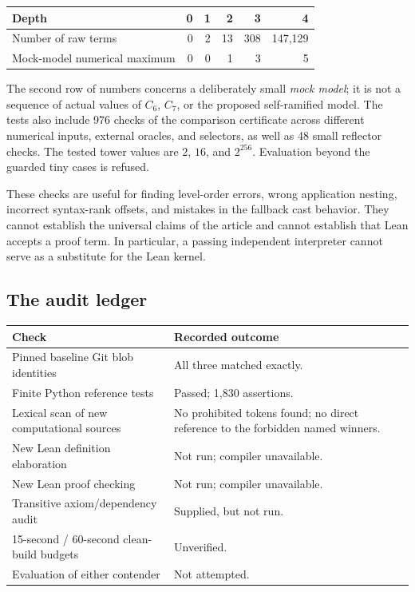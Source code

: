 \documentclass[11pt,letterpaper]{article}
\theoremstyle{definition}
\begin{document}
\begin{center}
\begin{tabular}{@{}lrrrrr@{}}
\toprule
Depth & 0 & 1 & 2 & 3 & 4\\
\midrule
Number of raw terms & 0 & 2 & 13 & 308 & 147,129\\
Mock-model numerical maximum & 0 & 0 & 1 & 3 & 5\\
\bottomrule
\end{tabular}
\end{center}

The second row of numbers concerns a deliberately small \emph{mock model};
it is not a sequence of actual values of $C_6$, $C_7$, or the proposed
self-ramified model. The tests also include 976 checks of the comparison
certificate across different numerical inputs, external oracles, and
selectors, as well as 48 small reflector checks. The tested tower values are
$2$, $16$, and $2^{256}$. Evaluation beyond the guarded tiny cases is refused.

These checks are useful for finding level-order errors, wrong application
nesting, incorrect syntax-rank offsets, and mistakes in the fallback cast
behavior. They cannot establish the universal claims of the article and
cannot establish that Lean accepts a proof term. In particular, a passing
independent interpreter cannot serve as a substitute for the Lean kernel.

\subsection{The audit ledger}

\begin{center}
\begin{tabular}{@{}p{}p{}@{}}
\toprule
Check & Recorded outcome\\
\midrule
Pinned baseline Git blob identities & All three matched exactly.\\
Finite Python reference tests & Passed; 1,830 assertions.\\
Lexical scan of new computational sources & No prohibited tokens found;
  no direct reference to the forbidden named winners.\\
New Lean definition elaboration & Not run; compiler unavailable.\\
New Lean proof checking & Not run; compiler unavailable.\\
Transitive axiom/dependency audit & Supplied, but not run.\\
15-second / 60-second clean-build budgets & Unverified.\\
Evaluation of either contender & Not attempted.\\
\bottomrule
\end{tabular}
\end{center}
\end{document}
